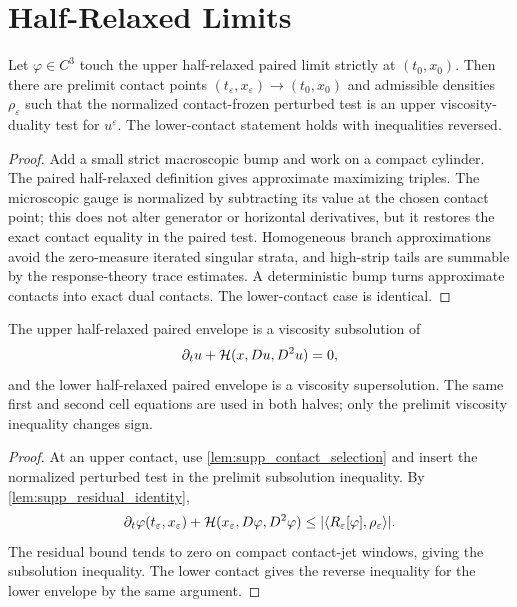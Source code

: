 \section{Half-Relaxed Limits}

\begin{lemma}
\label{lem:supp_contact_selection}
Let \(\varphi\in C^3\) touch the upper half-relaxed paired limit strictly at
\((t_0,x_0)\).  Then there are prelimit contact points
\((t_\varepsilon,x_\varepsilon)\to(t_0,x_0)\) and admissible densities
\(\rho_\varepsilon\) such that the normalized contact-frozen perturbed test is
an upper viscosity-duality test for \(u^\varepsilon\).  The lower-contact
statement holds with inequalities reversed.
\end{lemma}

\begin{proof}
Add a small strict macroscopic bump and work on a compact cylinder.  The paired
half-relaxed definition gives approximate maximizing triples.  The microscopic
gauge is normalized by subtracting its value at the chosen contact point; this
does not alter generator or horizontal derivatives, but it restores the exact
contact equality in the paired test.  Homogeneous branch approximations avoid
the zero-measure iterated singular strata, and high-strip tails are summable by
the response-theory trace estimates.  A deterministic bump turns approximate
contacts into exact dual contacts.  The lower-contact case is identical.
\end{proof}

\begin{proposition}
\label{prop:supp_subsuper_passage}
The upper half-relaxed paired envelope is a viscosity subsolution of
\[
  \partial_t u+\mathcal H(x,Du,D^2u)=0,
\]
and the lower half-relaxed paired envelope is a viscosity supersolution.  The
same first and second cell equations are used in both halves; only the
prelimit viscosity inequality changes sign.
\end{proposition}

\begin{proof}
At an upper contact, use \cref{lem:supp_contact_selection} and insert the
normalized perturbed test in the prelimit subsolution inequality.  By
\cref{lem:supp_residual_identity},
\[
  \partial_t\varphi(t_\varepsilon,x_\varepsilon)
  +\mathcal H(x_\varepsilon,D\varphi,D^2\varphi)
  \le
  |\langle R_\varepsilon[\varphi],\rho_\varepsilon\rangle|.
\]
The residual bound tends to zero on compact contact-jet windows, giving the
subsolution inequality.  The lower contact gives the reverse inequality for
the lower envelope by the same argument.
\end{proof}

